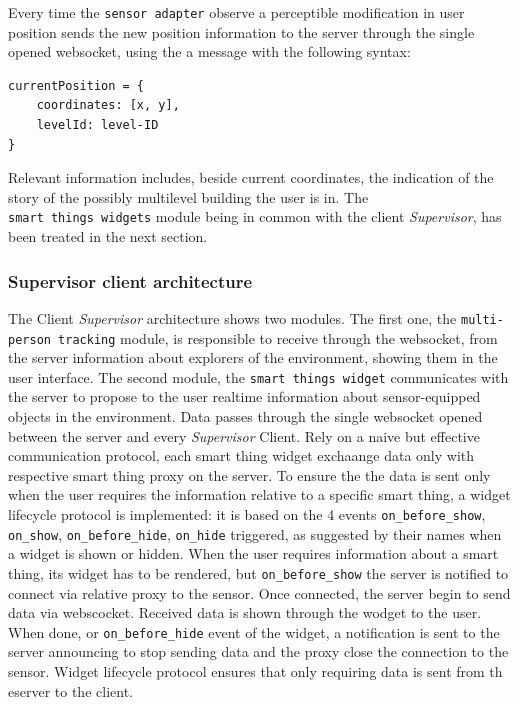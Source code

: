 \documentclass{sig-alternate}
\begin{document}
Every time the \texttt{sensor\ adapter} observe a perceptible
modification in user position sends the new position information to the
server through the single opened websocket, using the a message with the
following syntax:

\begin{verbatim}
currentPosition = {
    coordinates: [x, y],
    levelId: level-ID  
}
\end{verbatim}

Relevant information includes, beside current coordinates, the
indication of the story of the possibly multilevel building the user is
in. The \texttt{smart\ things\ widgets} module being in common with the
client \emph{Supervisor}, has been treated in the next section.

\subsubsection{Supervisor client architecture}\label{supervisor-client-architecture}

The Client \emph{Supervisor} architecture shows two modules. The first
one, the \texttt{multi-person\ tracking} module, is responsible to
receive through the websocket, from the server information about
explorers of the environment, showing them in the user interface. The
second module, the \texttt{smart\ things\ widget} communicates with the
server to propose to the user realtime information about sensor-equipped
objects in the environment. Data passes through the single websocket
opened between the server and every \emph{Supervisor} Client. Rely on a
naive but effective communication protocol, each smart thing widget
exchaange data only with respective smart thing proxy on the server. To
ensure the the data is sent only when the user requires the information
relative to a specific smart thing, a widget lifecycle protocol is
implemented: it is based on the 4 events \texttt{on\_before\_show},
\texttt{on\_show}, \texttt{on\_before\_hide}, \texttt{on\_hide}
triggered, as suggested by their names when a widget is shown or hidden.
When the user requires information about a smart thing, its widget has
to be rendered, but \texttt{on\_before\_show} the server is notified to
connect via relative proxy to the sensor. Once connected, the server
begin to send data via webscocket. Received data is shown through the
wodget to the user. When done, or \texttt{on\_before\_hide} event of the
widget, a notification is sent to the server announcing to stop sending
data and the proxy close the connection to the sensor. Widget lifecycle
protocol ensures that only requiring data is sent from th eserver to the
client.
\end{document}
